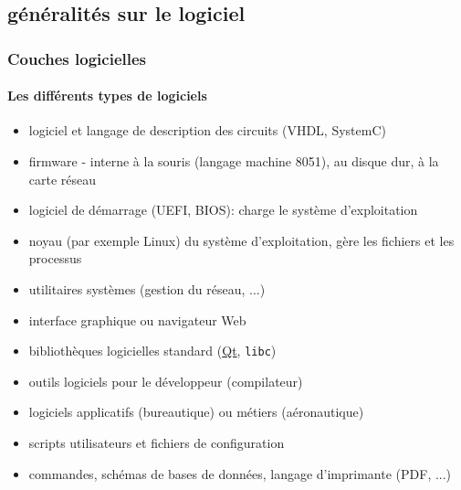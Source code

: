 \documentclass[xcolor=svgnames,final,smaller,a4]{beamer}
\begin{document}
\subsection{généralités sur le logiciel}

\begin{frame}
  \frametitle{Couches logicielles}
  \framesubtitle{Les différents types de logiciels}

\begin{itemize}

\item logiciel et langage de description des circuits (VHDL, SystemC)
\item firmware - interne à la souris (langage machine 8051), au disque dur, à la carte réseau
\item logiciel de démarrage (UEFI, BIOS): charge le système d'exploitation
\item noyau (par exemple Linux) du système d'exploitation, gère les fichiers et les processus
\item utilitaires systèmes (gestion du réseau, ...)
\item interface graphique ou navigateur Web
\item bibliothèques logicielles standard (\href{http://qt.io}{Qt}, \texttt{libc})
\item outils logiciels pour le développeur (compilateur)
\item logiciels applicatifs (bureautique) ou métiers (aéronautique)
\item scripts utilisateurs et fichiers de configuration
\item commandes, schémas de bases de données, langage d'imprimante (PDF, ...)

\end{itemize}
\end{frame}
\end{document}

